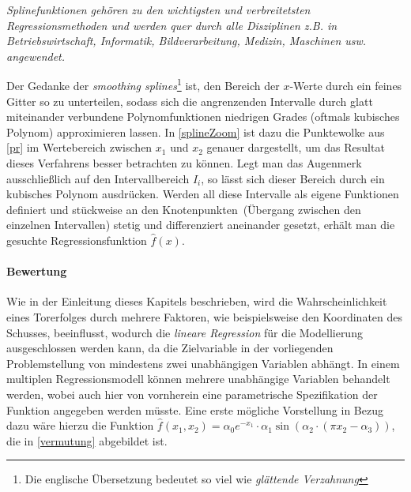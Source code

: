 \begin{itemize}

\textit{\glqq Splinefunktionen gehören zu den wichtigsten und verbreitetsten Regressionsmethoden und werden quer durch alle Disziplinen z.B. in Betriebswirtschaft, Informatik, Bildverarbeitung, Medizin, Maschinen usw. angewendet.\grqq} 

\enlargethispage{\baselineskip}Der Gedanke der \textit{smoothing splines}\footnote{Die englische Übersetzung bedeutet so viel wie \textit{glättende Verzahnung}} ist, den Bereich der $x$-Werte durch ein feines Gitter so zu unterteilen, sodass sich die angrenzenden Intervalle durch glatt miteinander verbundene Polynomfunktionen niedrigen Grades (oftmals kubisches Polynom) approximieren lassen. In \vref{splineZoom} ist dazu die Punktewolke aus \vref{pr} im Wertebereich zwischen $x_1$ und $x_2$ genauer dargestellt, um das Resultat dieses Verfahrens besser betrachten zu können. Legt man das Augenmerk ausschließlich auf den Intervallbereich $I_i$, so lässt sich dieser Bereich durch ein kubisches Polynom ausdrücken. Werden all diese Intervalle als eigene Funktionen definiert und stückweise an den \glqq Knotenpunkten\grqq~(Übergang zwischen den einzelnen Intervallen) stetig und differenziert aneinander gesetzt, erhält man die gesuchte Regressionsfunktion $\hat{f}(x)$.
\end{itemize}




\paragraph{Bewertung} Wie in der Einleitung dieses Kapitels beschrieben, wird die Wahrscheinlichkeit eines Torerfolges durch mehrere Faktoren, wie beispielsweise den Koordinaten des Schusses, beeinflusst, wodurch die \textit{lineare Regression} für die Modellierung ausgeschlossen werden kann, da die Zielvariable in der vorliegenden Problemstellung von mindestens zwei unabhängigen Variablen abhängt. In einem multiplen Regressionsmodell können mehrere unabhängige Variablen behandelt werden, wobei auch hier von vornherein eine parametrische Spezifikation der Funktion angegeben werden müsste. Eine erste mögliche Vorstellung in Bezug dazu wäre hierzu die Funktion $\hat{f}(x_1,x_2) = \alpha_0 e^{-x_1} \cdot \alpha_1\sin(\alpha_2 \cdot (\pi x_2 - \alpha_3))$, die in \vref{vermutung} abgebildet ist. 


